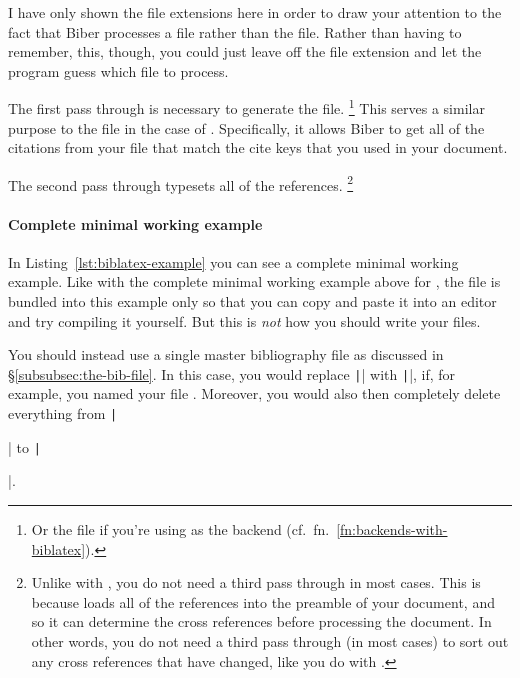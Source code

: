 I have only shown the file extensions here in order to draw your attention to the fact that Biber processes a  file rather than the  file.
Rather than having to remember, this, though, you could just leave off the file extension and let the program guess which file to process.

The first pass through  is necessary to generate the  file.%
\footnote{%
Or the  file if you're using  as the backend (cf.~fn.~\ref{fn:backends-with-biblatex}).
}
This serves a similar purpose to the  file in the case of .
Specifically, it allows Biber to get all of the citations from your  file that match the cite keys that you used in your  document.

The second pass through  typesets all of the references.%
\footnote{%
Unlike with , you do not need a third pass through  in most cases.
This is because  loads all of the references into the preamble of your document, and so it can determine the cross references before processing the document.
In other words, you do not need a third pass through  (in most cases) to sort out any cross references that have changed, like you do with .%
}

\paragraph{Complete minimal working example}

In Listing~\ref{lst:biblatex-example} you can see a complete minimal working example.
Like with the complete minimal working example above for , the  file is bundled into this example only so that you can copy and paste it into an editor and try compiling it yourself.
But this is \emph{not} how you should write your  files.

You should instead use a single master bibliography file as discussed in \S\ref{subsubsec:the-bib-file}.
In this case, you would replace \texttt|| with \texttt||, if, for example, you named your  file .
Moreover, you would also then completely delete everything from \texttt|\begin{filecontents}| to \texttt|\end{filecontents}|.

